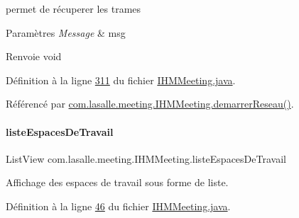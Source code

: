 permet de récuperer les trames 


\begin{DoxyParams}{Paramètres}
{\em Message} & msg \\
\hline
\end{DoxyParams}
\begin{DoxyReturn}{Renvoie}
void 
\end{DoxyReturn}


Définition à la ligne \hyperlink{_i_h_m_meeting_8java_source_l00311}{311} du fichier \hyperlink{_i_h_m_meeting_8java_source}{I\+H\+M\+Meeting.\+java}.



Référencé par \hyperlink{_i_h_m_meeting_8java_source_l00082}{com.\+lasalle.\+meeting.\+I\+H\+M\+Meeting.\+demarrer\+Reseau()}.

\mbox{\label{classcom_1_1lasalle_1_1meeting_1_1_i_h_m_meeting_ae32ea3420cbe17af0b32df447e326427}} 
\paragraph{\texorpdfstring{liste\+Espaces\+De\+Travail}{listeEspacesDeTravail}}
{\footnotesize\ttfamily List\+View com.\+lasalle.\+meeting.\+I\+H\+M\+Meeting.\+liste\+Espaces\+De\+Travail\hspace{0.3cm}{\ttfamily [private]}}



Affichage des espaces de travail sous forme de liste. 



Définition à la ligne \hyperlink{_i_h_m_meeting_8java_source_l00046}{46} du fichier \hyperlink{_i_h_m_meeting_8java_source}{I\+H\+M\+Meeting.\+java}.

\mbox{\label{classcom_1_1lasalle_1_1meeting_1_1_i_h_m_meeting_a64f84fda5f7f595cf0c75ccfb189af8d}} 
